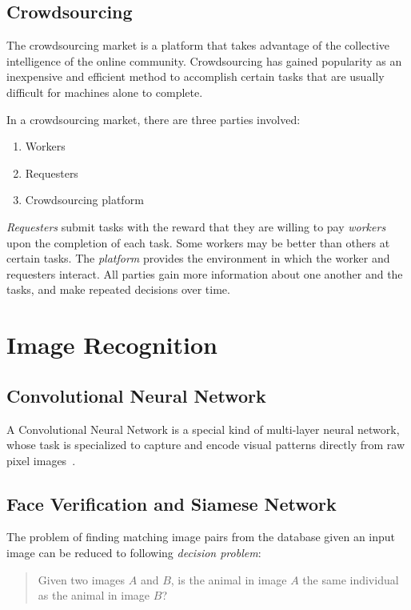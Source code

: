   \subsection{Crowdsourcing}

  The crowdsourcing market is a platform that takes advantage of the collective intelligence
  of the online community. Crowdsourcing has gained popularity as an inexpensive
  and efficient method to accomplish certain tasks that are usually difficult for
  machines alone to complete.

  In a crowdsourcing market, there are three parties involved:
  \begin{enumerate}
  	\item Workers
  	\item Requesters
  	\item Crowdsourcing platform
  \end{enumerate}

  \emph{Requesters} submit tasks with the reward that they are
  willing to pay \emph{workers} upon the completion of each task. Some workers
  may be better than others at certain tasks. The \emph{platform} provides the
  environment in which the worker and requesters interact. All parties gain more
  information about one another and the tasks, and make repeated decisions
  over time.


\section{Image Recognition}

  \subsection{Convolutional Neural Network}

  A Convolutional Neural Network is a special kind of multi-layer neural network,
  whose task is specialized to capture and encode visual patterns directly from
  raw pixel images~\cite{lecun95}.

  \subsection{Face Verification and Siamese Network}

  The problem of finding matching image pairs from the database given an input
  image can be reduced to following \emph{decision problem}:
  \begin{quote}
  \centering
  Given two images $A$ and $B$, is the animal in image $A$ the same individual as the
  animal in image $B$?
  \end{quote}

